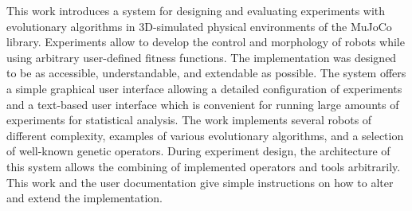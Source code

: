 \documentclass[12pt]{report}
\begin{document}
This work introduces a system for designing and evaluating experiments with
evolutionary algorithms in 3D-simulated physical environments of the MuJoCo
library. Experiments allow to develop the control and morphology of robots
while using arbitrary user-defined fitness functions. The implementation was
designed to be as accessible, understandable, and extendable as possible. The
system offers a simple graphical user interface allowing a detailed
configuration of experiments and a text-based user interface which is
convenient for running large amounts of experiments for statistical analysis.
The work implements several robots of different complexity, examples of various
evolutionary algorithms, and a selection of well-known genetic operators.
During experiment design, the architecture of this system allows the combining
of implemented operators and tools arbitrarily. This work and the user
documentation give simple instructions on how to alter and extend the
implementation.
\end{document}
